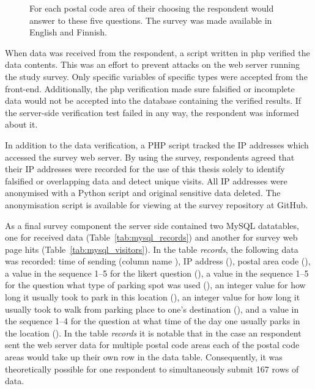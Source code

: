 \begin{figure}[H]%
    \centering
    \qquad
    \caption[Research survey questions in the web application]{For each postal code area of their choosing the respondent would answer to these five questions. The survey was made available in English and Finnish.}%
    \label{fig:js_survey_questions}%
\end{figure}

When data was received from the respondent, a script written in \gls{php} verified the data contents. This was an effort to prevent attacks on the web server running the study survey. Only specific variables of specific types were accepted from the front-end. Additionally, the \gls{php} verification made sure falsified or incomplete data would not be accepted into the database containing the verified results. If the server-side verification test failed in any way, the respondent was informed about it. 

In addition to the data verification, a PHP script tracked the IP addresses which accessed the survey web server. By using the survey, respondents agreed that their IP addresses were recorded for the use of this thesis solely to identify falsified or overlapping data and detect unique visits. All IP addresses were anonymised with a Python script and original sensitive data deleted. The anonymisation script is available for viewing at the survey repository at GitHub.

As a final survey component the server side contained two MySQL datatables, one for received data (Table~\ref{tab:mysql_records}) and another for survey web page hits (Table~\ref{tab:mysql_visitors}). In the table \textit{records}, the following data was recorded: time of sending (column name ), IP address (), postal area code (), a value in the sequence 1--5 for the likert question (), a value in the sequence 1--5 for the question what type of parking spot was used (), an integer value for how long it usually took to park in this location (), an integer value for how long it usually took to walk from parking place to one's destination (), and a value in the sequence 1--4 for the question at what time of the day one usually parks in the location (). In the table \textit{records} it is notable that in the case an respondent sent the web server data for multiple postal code areas each of the postal code areas would take up their own row in the data table. Consequently, it was theoretically possible for one respondent to simultaneously submit 167 rows of data.

